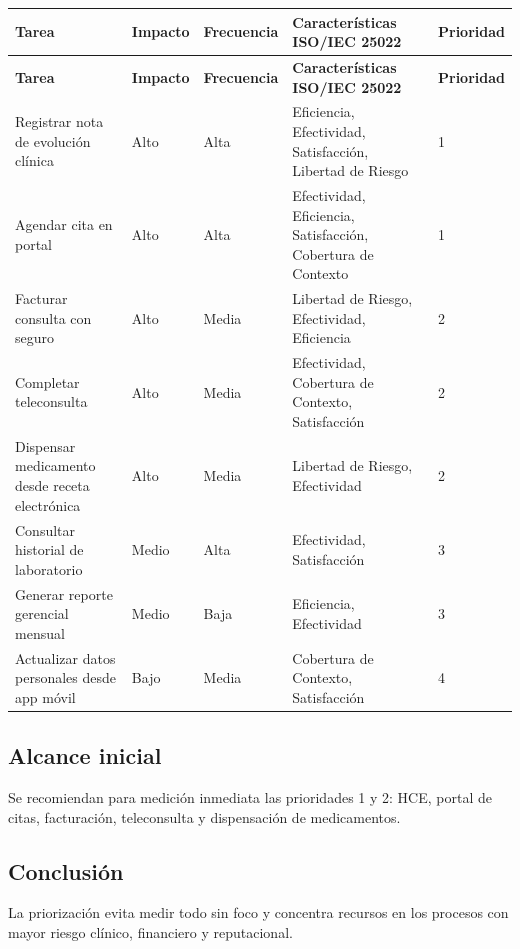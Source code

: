 \documentclass[11pt]{article}
\begin{document}
\small
\begin{longtable}{p{} p{} p{} p{} p{}}
\toprule
\textbf{Tarea} & \textbf{Impacto} & \textbf{Frecuencia} & \textbf{Características ISO/IEC 25022} & \textbf{Prioridad} \\
\midrule
\endfirsthead
\toprule
\textbf{Tarea} & \textbf{Impacto} & \textbf{Frecuencia} & \textbf{Características ISO/IEC 25022} & \textbf{Prioridad} \\
\midrule
\endhead
Registrar nota de evolución clínica & Alto & Alta & Eficiencia, Efectividad, Satisfacción, Libertad de Riesgo & 1 \\
Agendar cita en portal & Alto & Alta & Efectividad, Eficiencia, Satisfacción, Cobertura de Contexto & 1 \\
Facturar consulta con seguro & Alto & Media & Libertad de Riesgo, Efectividad, Eficiencia & 2 \\
Completar teleconsulta & Alto & Media & Efectividad, Cobertura de Contexto, Satisfacción & 2 \\
Dispensar medicamento desde receta electrónica & Alto & Media & Libertad de Riesgo, Efectividad & 2 \\
Consultar historial de laboratorio & Medio & Alta & Efectividad, Satisfacción & 3 \\
Generar reporte gerencial mensual & Medio & Baja & Eficiencia, Efectividad & 3 \\
Actualizar datos personales desde app móvil & Bajo & Media & Cobertura de Contexto, Satisfacción & 4 \\
\bottomrule
\end{longtable}
\normalsize

\subsection*{Alcance inicial}
Se recomiendan para medición inmediata las prioridades 1 y 2: HCE, portal de citas, facturación, teleconsulta y dispensación de medicamentos.

\subsection*{Conclusión}
La priorización evita medir todo sin foco y concentra recursos en los procesos con mayor riesgo clínico, financiero y reputacional.
\end{document}
